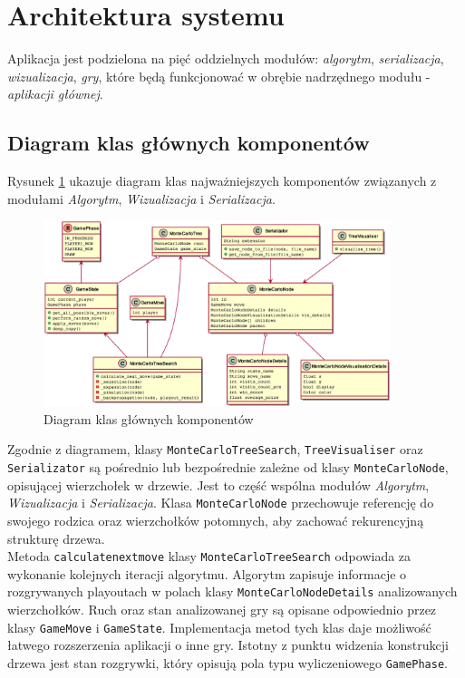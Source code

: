 \documentclass{article}
\let\oldsection\section
\renewcommand\section{\clearpage\oldsection}
\newcommand{\code}[1]{\colorbox{light-gray}{\texttt{#1}}}
\newcommand{\modulename}[1]{\textit{#1}}
\begin{document}
\section{Architektura systemu}
Aplikacja jest podzielona na pięć oddzielnych modułów: \modulename{algorytm}, \modulename{serializacja}, \modulename{wizualizacja}, \modulename{gry}, które będą funkcjonować w obrębie nadrzędnego modułu - \modulename{aplikacji głównej}. 


\subsection{Diagram klas głównych komponentów}

\noindent Rysunek \ref{rys:umldiagrammain} ukazuje diagram klas najważniejszych komponentów związanych z modułami \modulename{Algorytm}, \modulename{Wizualizacja} i \modulename{Serializacja}.

\begin{figure}[h]
	\centering
	\includegraphics[width=0.9\textwidth]{umldiagram}
	\caption{Diagram klas głównych komponentów}
	\label{rys:umldiagrammain}
\end{figure}
\noindent Zgodnie z diagramem, klasy \code{MonteCarloTreeSearch}, \code{TreeVisualiser} oraz \code{Serializator} są pośrednio lub bezpośrednie zależne od klasy \code{MonteCarloNode}, opisującej wierzchołek w drzewie. Jest to część wspólna modułów \modulename{Algorytm}, \modulename{Wizualizacja} i \modulename{Serializacja}. Klasa \code{MonteCarloNode} przechowuje referencję do swojego rodzica oraz wierzchołków potomnych, aby zachować rekurencyjną strukturę drzewa.\\

\noindent Metoda \code{calculate\textunderscore next\textunderscore move} klasy \code{MonteCarloTreeSearch} odpowiada za wykonanie kolejnych iteracji algorytmu. Algorytm zapisuje informacje o rozgrywanych playoutach w polach klasy \code{MonteCarloNodeDetails} analizowanych wierzchołków. Ruch oraz stan analizowanej gry są opisane odpowiednio przez klasy \code{GameMove} i \code{GameState}. Implementacja metod tych klas daje możliwość łatwego rozszerzenia aplikacji o inne gry. Istotny z punktu widzenia konstrukcji drzewa jest stan rozgrywki, który opisują pola typu wyliczeniowego \code{GamePhase}.
\end{document}
